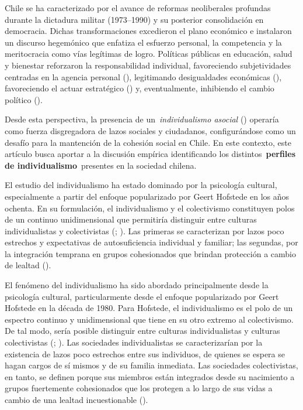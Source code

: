 \documentclass[
  letterpaper,
  DIV=11,
  numbers=noendperiod]{scrartcl}
\begin{document}
Chile se ha caracterizado por el avance de reformas neoliberales
profundas durante la dictadura militar (1973--1990) y su posterior
consolidación en democracia. Dichas transformaciones excedieron el plano
económico e instalaron un discurso hegemónico que enfatiza el esfuerzo
personal, la competencia y la meritocracia como vías legítimas de logro.
Políticas públicas en educación, salud y bienestar reforzaron la
responsabilidad individual, favoreciendo subjetividades centradas en la
agencia personal (),
legitimando desigualdades económicas
(),
favoreciendo el actuar estratégico () y, eventualmente, inhibiendo el cambio político
().

Desde esta perspectiva, la presencia de un~\emph{individualismo asocial}
() operaría como fuerza disgregadora
de lazos sociales y ciudadanos, configurándose como un desafío para la
mantención de la cohesión social en Chile. En este contexto, este
artículo busca aportar a la discusión empírica identificando los
distintos~\textbf{perfiles de individualismo}~presentes en la sociedad
chilena.

El estudio del individualismo ha estado dominado por la psicología
cultural, especialmente a partir del enfoque popularizado por Geert
Hofstede en los años ochenta. En su formulación, el individualismo y el
colectivismo constituyen polos de un continuo unidimensional que
permitiría distinguir entre culturas individualistas y colectivistas
(;
). Las primeras se caracterizan por
lazos poco estrechos y expectativas de autosuficiencia individual y
familiar; las segundas, por la integración temprana en grupos
cohesionados que brindan protección a cambio de lealtad
().

El fenómeno del individualismo ha sido abordado principalmente desde la
psicología cultural, particularmente desde el enfoque popularizado por
Geert Hofstede en la década de 1980. Para Hofstede, el individualismo es
el polo de un espectro continuo y unidimensional que tiene en su otro
extremo al colectivismo. De tal modo, sería posible distinguir entre
culturas individualistas y culturas colectivistas
(;
). Las sociedades individualistas se
caracterizarían por la existencia de lazos poco estrechos entre sus
individuos, de quienes se espera se hagan cargos de sí mismos y de su
familia inmediata. Las sociedades colectivistas, en tanto, se definen
porque sus miembros están integrados desde su nacimiento a grupos
fuertemente cohesionados que los protegen a lo largo de sus vidas a
cambio de una lealtad incuestionable ().
\end{document}
